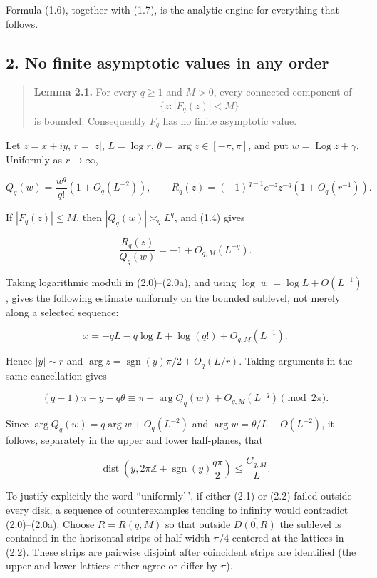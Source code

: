 \documentclass[11pt]{article}
\DeclareMathOperator{\Log}{Log}
\theoremstyle{keio}
\theoremstyle{definition}
\theoremstyle{remark}
\begin{document}
Formula (1.6), together with (1.7), is the analytic engine for everything
that follows.

\subsection{2. No finite asymptotic values in any order}

\begin{quote}
\textbf{Lemma 2.1.} For every \(q\geq1\) and \(M>0\), every connected
component of
\[
 \{z:|F_q(z)|<M\}
\]
is bounded. Consequently \(F_q\) has no finite asymptotic value.
\end{quote}

Let \(z=x+iy\), \(r=|z|\), \(L=\log r\),
\(\theta=\arg z\in[-\pi,\pi]\), and put \(w=\Log z+\gamma\). Uniformly
as \(r\to\infty\),

\[
 Q_q(w)=\frac{w^q}{q!}\left(1+O_q(L^{-2})\right),
 \qquad
 R_q(z)=(-1)^{q-1}e^{-z}z^{-q}\left(1+O_q(r^{-1})\right).
\tag{Inv-2.0}
\]

If \(|F_q(z)|\leq M\), then \(|Q_q(w)|\asymp_q L^q\), and (1.4) gives

\[
 \frac{R_q(z)}{Q_q(w)}=-1+O_{q,M}(L^{-q}).
\tag{Inv-2.0a}
\]

Taking logarithmic moduli in (2.0)--(2.0a), and using
\(\log|w|=\log L+O(L^{-1})\), gives the following estimate uniformly on
the bounded sublevel, not merely along a selected sequence:

\[
 x=-qL-q\log L+\log(q!)+O_{q,M}(L^{-1}).
\tag{Inv-2.1}
\]

Hence \(|y|\sim r\) and
\(\arg z=\operatorname{sgn}(y)\pi/2+O_q(L/r)\). Taking arguments in the
same cancellation gives

\[
 (q-1)\pi-y-q\theta
 \equiv \pi+\arg Q_q(w)+O_{q,M}(L^{-q})\pmod{2\pi}.
\]

Since \(\arg Q_q(w)=q\arg w+O_q(L^{-2})\) and
\(\arg w=\theta/L+O(L^{-2})\), it follows, separately in the upper and
lower half-planes, that

\[
 \operatorname{dist}\!\left(
 y,2\pi\mathbb Z+\operatorname{sgn}(y)\frac{q\pi}{2}
 \right)\leq \frac{C_{q,M}}L.
\tag{Inv-2.2}
\]

To justify explicitly the word ``uniformly'\,', if either (2.1) or (2.2)
failed outside every disk, a sequence of counterexamples tending to infinity
would contradict (2.0)--(2.0a). Choose \(R=R(q,M)\) so that outside
\(\overline{D(0,R)}\) the sublevel is contained in the horizontal strips of
half-width \(\pi/4\) centered at the lattices in (2.2). These strips are
pairwise disjoint after coincident strips are identified (the upper and
lower lattices either agree or differ by \(\pi\)).
\end{document}
